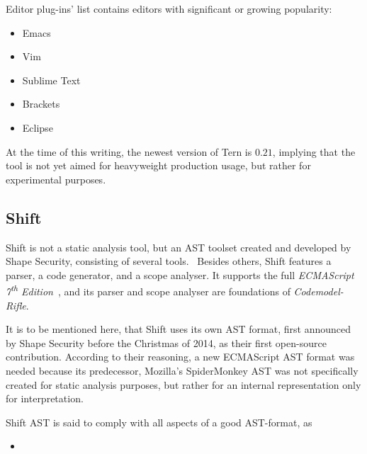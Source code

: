 Editor plug-ins' list contains editors with significant or growing popularity:

\begin{itemize}
\item Emacs
\item Vim
\item Sublime Text
\item Brackets
\item Eclipse
\end{itemize}

At the time of this writing, the newest version of Tern is $0.21$, implying that the tool is not yet aimed for heavyweight production usage, but rather for experimental purposes.


\subsection{Shift}

Shift is not a static analysis tool, but an AST toolset created and developed by Shape Security, consisting of several tools.~\cite{shift-ast} Besides others, Shift features a parser, a code generator, and a scope analyser. It supports the full \emph{ECMAScript 7\textsuperscript{th} Edition}~\cite{shift-ast}, and its parser and scope analyser are foundations of \emph{Codemodel-Rifle}.

It is to be mentioned here, that Shift uses its own AST format, first announced by Shape Security before the Christmas of 2014, as their first open-source contribution. According to their reasoning, a new ECMAScript AST format was needed because its predecessor, Mozilla's SpiderMonkey AST was not specifically created for static analysis purposes, but rather for an internal representation only for interpretation.

Shift AST is said to comply with all aspects of a good AST-format, as

\begin{itemize}
\item {}~\cite{shift-ast-comparison}
\end{itemize}

